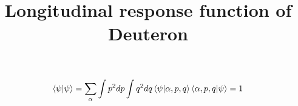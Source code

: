 \documentclass[8pt]{article}
\title{Longitudinal response function of Deuteron}
\begin{document}
\begin{equation}
  \begin{aligned}
  \braket{\psi|\psi} 
  = \sum_{\alpha}\int{p^2dp}\int{q^2dq}\braket{\psi|\alpha, p, q} \braket{\alpha, p, q| \psi}
  = 1
  \end{aligned}
\end{equation}
\end{document}
